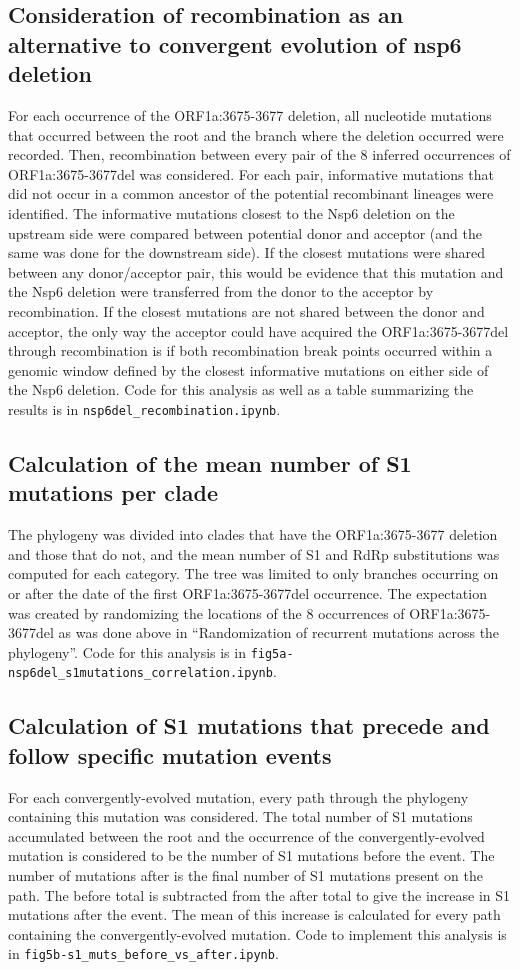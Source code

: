 \documentclass[11pt,oneside,letterpaper]{article}
\begin{document}
\subsection*{Consideration of recombination as an alternative to convergent evolution of nsp6 deletion}
For each occurrence of the ORF1a:3675-3677 deletion, all nucleotide mutations that occurred between the root and the branch where the deletion occurred were recorded.
Then, recombination between every pair of the 8 inferred occurrences of ORF1a:3675-3677del was considered.
For each pair, informative mutations that did not occur in a common ancestor of the potential recombinant lineages were identified.
The informative mutations closest to the Nsp6 deletion on the upstream side were compared between potential donor and acceptor (and the same was done for the downstream side).
If the closest mutations were shared between any donor/acceptor pair, this would be evidence that this mutation and the Nsp6 deletion were transferred from the donor to the acceptor by recombination.
If the closest mutations are not shared between the donor and acceptor, the only way the acceptor could have acquired the ORF1a:3675-3677del through recombination is if both recombination break points occurred within a genomic window defined by the closest informative mutations on either side of the Nsp6 deletion.
Code for this analysis as well as a table summarizing the results is in \texttt{nsp6del\_recombination.ipynb}.

\subsection*{Calculation of the mean number of S1 mutations per clade}
The phylogeny was divided into clades that have the ORF1a:3675-3677 deletion and those that do not, and the mean number of S1 and RdRp substitutions was computed for each category.
The tree was limited to only branches occurring on or after the date of the first ORF1a:3675-3677del occurrence.
The expectation was created by randomizing the locations of the 8 occurrences of ORF1a:3675-3677del as was done above in “Randomization of recurrent mutations across the phylogeny”.
Code for this analysis is in \texttt{fig5a-nsp6del\_s1mutations\_correlation.ipynb}.

\subsection*{Calculation of S1 mutations that precede and follow specific mutation events}
For each convergently-evolved mutation, every path through the phylogeny containing this mutation was considered.
The total number of S1 mutations accumulated between the root and the occurrence of the convergently-evolved mutation is considered to be the number of S1 mutations before the event.
The number of mutations after is the final number of S1 mutations present on the path.
The before total is subtracted from the after total to give the increase in S1 mutations after the event.
The mean of this increase is calculated for every path containing the convergently-evolved mutation.
Code to implement this analysis is in \texttt{fig5b-s1\_muts\_before\_vs\_after.ipynb}.
\end{document}
